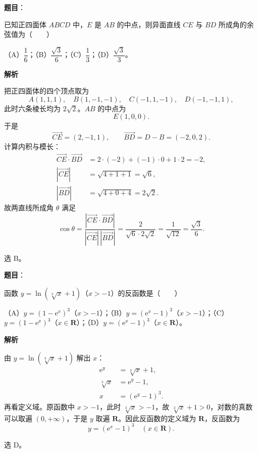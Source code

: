 \begin{answer}

\textbf{题目}：

已知正四面体 $ABCD$ 中，$E$ 是 $AB$ 的中点，则异面直线 $CE$ 与 $BD$ 所成角的余弦值为\mbox{（　　）}

（A）$\dfrac16$；（B）$\dfrac{\sqrt3}{6}$；（C）$\dfrac13$；（D）$\dfrac{\sqrt3}{3}$。

\textbf{解析}

把正四面体的四个顶点取为
\nopagebreak[4]
\[A(1,1,1),\quad B(1,-1,-1),\quad C(-1,1,-1),\quad D(-1,-1,1),\]
此时六条棱长均为 $2\sqrt2$。$AB$ 的中点为
\nopagebreak[4]
\[E(1,0,0).\]
于是
\nopagebreak[4]
\[\overrightarrow{CE}=(2,-1,1),\qquad
\overrightarrow{BD}=D-B=(-2,0,2).\]
计算内积与模长：
\nopagebreak[4]
\[\begin{aligned}
\overrightarrow{CE}\cdot\overrightarrow{BD}
&=2\cdot(-2)+(-1)\cdot0+1\cdot2=-2,\\
|\overrightarrow{CE}|&=\sqrt{4+1+1}=\sqrt6,\\
|\overrightarrow{BD}|&=\sqrt{4+0+4}=2\sqrt2.
\end{aligned}\]
故两直线所成角 $\theta$ 满足
\nopagebreak[4]
\[\cos\theta=\frac{|\overrightarrow{CE}\cdot\overrightarrow{BD}|}
{|\overrightarrow{CE}|\,|\overrightarrow{BD}|}
=\frac{2}{\sqrt6\cdot2\sqrt2}
=\frac{1}{\sqrt{12}}=\frac{\sqrt3}{6}.\]

选 B。


\end{answer}
\begin{answer}

\textbf{题目}：

函数 $y=\ln(\sqrt[3]{x}+1)$（$x>-1$）的反函数是\mbox{（　　）}

（A）$y=(1-\mathrm e^x)^3$（$x>-1$）；（B）$y=(\mathrm e^x-1)^3$（$x>-1$）；（C）$y=(1-\mathrm e^x)^3$（$x\in\mathbf R$）；（D）$y=(\mathrm e^x-1)^3$（$x\in\mathbf R$）。

\textbf{解析}

由 $y=\ln(\sqrt[3]{x}+1)$ 解出 $x$：
\nopagebreak[4]
\[\begin{aligned}
\mathrm e^y&=\sqrt[3]{x}+1,\\
\sqrt[3]{x}&=\mathrm e^y-1,\\
x&=(\mathrm e^y-1)^3.
\end{aligned}\]
再看定义域。原函数中 $x>-1$，此时 $\sqrt[3]{x}>-1$，故 $\sqrt[3]{x}+1>0$，对数的真数可以取遍 $(0,+\infty)$，于是 $y$ 取遍 $\mathbf R$。因此反函数的定义域为 $\mathbf R$，反函数为
\nopagebreak[4]
\[y=(\mathrm e^x-1)^3\quad(x\in\mathbf R).\]

选 D。


\end{answer}
